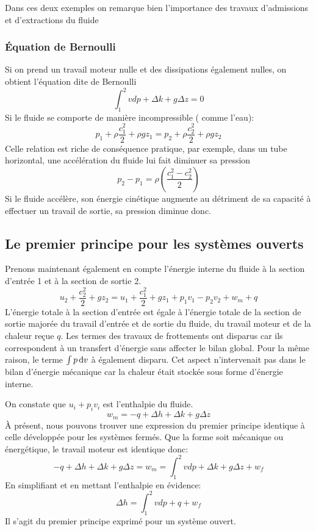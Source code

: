 Dans ces deux exemples on remarque bien
l'importance des travaux d'admissions et d'extractions du fluide

\subsubsection{Équation de Bernoulli}
Si on prend un travail moteur nulle et
des dissipations également nulles, on obtient l'équation dite de Bernoulli
\[ \int_1^2 vdp + \Delta k + g \Delta z = 0 \]
Si le fluide se comporte de manière incompressible ( comme l'eau):
\[ p_1 + \rho \frac{c_1^2}{2}+\rho gz_1 =
p_2 + \rho \frac{c_2^2}{2}+\rho gz_2 \]
Celle relation est riche de conséquence pratique, par exemple,
dans un tube horizontal,
une accélération du fluide lui fait diminuer sa pression
\[  p_2 - p_1 = \rho \left (\frac{c_1^2-c_2^2}{2}\right) \]
Si le fluide accélère,
son énergie cinétique augmente au détriment de sa capacité à
effectuer un travail de sortie, sa pression diminue donc.

\subsection{Le premier principe pour les systèmes ouverts}
Prenons maintenant également en compte l'énergie interne
du fluide à la section d'entrée 1 et à la section de sortie 2.
\[ u_2 + \frac{c_2^2}{2} +gz_2 =
u_1 +\frac{c_1^2}{2} + gz_1 + p_1v_1- p_2v_2 + w_m + q \]
L'énergie totale à la section d'entrée est égale à
l'énergie totale de la section de sortie majorée du travail d'entrée et
de sortie du fluide, du travail moteur et de la chaleur reçue $q$.
Les termes des travaux de frottements ont disparus car
ils correspondent à un transfert d'énergie sans affecter le bilan global.
Pour la même raison, le terme $\int p \operatorname{d}\! v$ à également disparu.
Cet aspect n'intervenait pas dans le bilan d'énergie mécanique
car la chaleur était stockée sous forme d'énergie interne.

On constate que $u_i + p_iv_i$ est l'enthalpie du fluide.
\[ w_m = -q + \Delta h + \Delta k +g \Delta z \]
À présent, nous pouvons trouver une expression
du premier principe identique à celle développée pour les systèmes fermés.
Que la forme soit mécanique ou énergétique,
le travail moteur est identique donc:
\[ -q + \Delta h + \Delta k +g \Delta z = w_m =
\int_1^2vdp+\Delta k +g\Delta z +w_f \]
En simplifiant et en mettant l'enthalpie en évidence:
\[ \Delta h = \int_1^2vdp + q + w_f \]
Il s'agit du premier principe exprimé pour un système ouvert.

